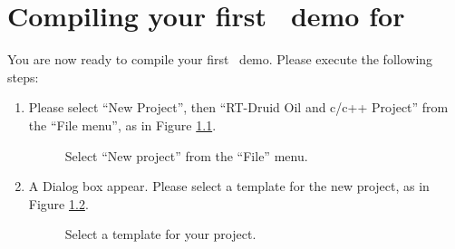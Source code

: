 \chapter{Compiling your first \ee\ demo for \dspic}


You are now ready to compile your first \ee\ demo. Please execute the
following steps:

\begin{enumerate}

\item
  Please select ``New Project'', then ``RT-Druid Oil and c/c++
  Project'' from the ``File menu'', as in Figure
  \ref{fig:new-project}.
%
\begin{figure}[htb]
\caption{Select ``New project'' from the ``File'' menu.}
\label{fig:new-project}
\end{figure}

\item
  A Dialog box appear. Please select a template for the new project,
  as in Figure \ref{fig:new-project2}.
%
\begin{figure}[htb]
\caption{Select a template for your project.}
\label{fig:new-project2}
\end{figure}


\end{enumerate}

